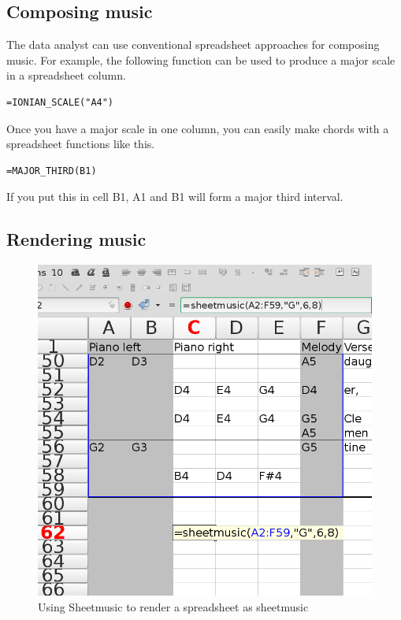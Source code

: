 \documentclass{acm_proc_article-sp}
\begin{document}
\subsection{Composing music}
The data analyst can use conventional spreadsheet approaches for
composing music. For example, the following function can be used
to produce a major scale in a spreadsheet column.

\begin{verbatim}
=IONIAN_SCALE("A4")
\end{verbatim}

Once you have a major scale in one column, you can easily make
chords with a spreadsheet functions like this.
\begin{verbatim}
=MAJOR_THIRD(B1)
\end{verbatim}
If you put this in cell B1, A1 and B1 will form a major third interval.

\subsection{Rendering music}
\begin{figure}
\includegraphics[width=\columnwidth]{../sheetmusic/sheetmusic-function-call.png}
\centering
\caption{Using Sheetmusic to render a spreadsheet as sheetmusic}
\end{figure}
\end{document}
